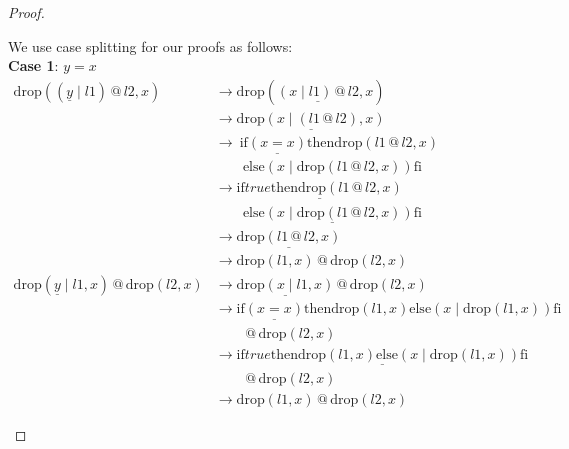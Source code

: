 \documentclass[12pt, a4paper]{article}
\newcommand{\rel}[1]{\mathrel{#1}}
\newcommand{\rmx}[1]{\mathrm{#1}}
\newcommand{\larrow}{\longrightarrow}
\newcommand{\under}{\underline}
\begin{document}
\begin{proof}
\begin{description}
We use case splitting for our proofs as follows: \\
\textbf{Case 1}: $y = x$
\begin{align*}
\rmx{drop}((\under{y} \rel{|} l1) \rel{@} l2, x)
	&\larrow \rmx{drop}(\under{(x \rel{|} l1) \rel{@} l2}, x) \tag{by case splitting} \\
	&\larrow \under{\rmx{drop}(x \rel{|} (l1 \rel{@} l2), x)} \tag{by @2} \\
	&\larrow\ \rel{\rmx{if}} \under{(x = x)} \rel{\rmx{then}} \rmx{drop}(l1 \rel{@} l2, x) \\
	&\quad \quad \rel{\rmx{else}} (x \rel{|} \rmx{drop}(l1 \rel{@} l2, x)) \rel{\rmx{fi}} \tag{by drop2} \\
	&\larrow \under{\rel{\rmx{if}} true \rel{\rmx{then}} \rmx{drop}(l1 \rel{@} l2, x)} \\
	&\quad \quad \under{\rel{\rmx{else}} (x \rel{|} \rmx{drop}(l1 \rel{@} l2, x)) \rel{\rmx{fi}}} \tag{by equality} \\
	&\larrow \under{\rmx{drop}(l1 \rel{@} l2, x)} \tag{by if1} \\
	&\larrow \rmx{drop}(l1, x) \rel{@} \rmx{drop}(l2, x) \tag{by IH} \\
\rmx{drop}(\under{y} \rel{|} l1, x) \rel{@} \rmx{drop}(l2, x)
	&\larrow \under{\rmx{drop}(x \rel{|} l1, x)} \rel{@} \rmx{drop}(l2, x) \tag{by case splitting} \\
	&\larrow \rel{\rmx{if}} \under{(x = x)} \rel{\rmx{then}} \rmx{drop}(l1, x) \rel{\rmx{else}} (x \rel{|} \rmx{drop}(l1, x)) \rel{\rmx{fi}} \\
	&\quad \quad \rel{@} \rmx{drop}(l2, x) \tag{by drop2} \\
	&\larrow \under{\rel{\rmx{if}} true \rel{\rmx{then}} \rmx{drop}(l1, x) \rel{\rmx{else}} (x \rel{|} \rmx{drop}(l1, x)) \rel{\rmx{fi}}} \\
	&\quad \quad \rel{@} \rmx{drop}(l2, x) \tag{by equality} \\
	&\larrow \rmx{drop}(l1, x) \rel{@} \rmx{drop}(l2, x) \tag{by if1}
\end{align*}


\end{description}
\end{proof}
\end{document}

